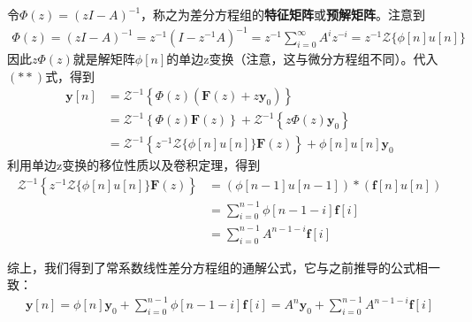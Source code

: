 令$\Phi(z)=(zI - A)^{-1}$，称之为差分方程组的\textbf{特征矩阵}或\textbf{预解矩阵}。注意到\begin{align*}
    \Phi(z)=(zI - A)^{-1} = z^{-1} (I - z^{-1} A)^{-1} = z^{-1} \sum_{i=0}^{\infty}A^i z^{-i} = z^{-1}\mathcal{Z}\{\phi[n]u[n]\}
\end{align*}
因此$z\Phi(z)$就是解矩阵$\phi[n]$的单边z变换（注意，这与微分方程组不同）。代入$(**)$式，得到
\begin{align*}
    \mathbf{y}[n] & = \mathcal{Z}^{-1} \left\{\Phi(z)(\mathbf{F}(z) + z\mathbf{y}_0)\right\}\\
    &= \mathcal{Z}^{-1} \left\{\Phi(z) \mathbf{F}(z)\right\} + \mathcal{Z}^{-1} \left\{z\Phi(z)\mathbf{y}_0\right\}\\
    & = \mathcal{Z}^{-1} \left\{z^{-1}\mathcal{Z}\{\phi[n]u[n]\} \mathbf{F}(z)\right\} +\phi[n]u[n]\mathbf{y}_0
\end{align*}
利用单边z变换的移位性质以及卷积定理，得到\begin{align*}
    \mathcal{Z}^{-1} \left\{z^{-1}\mathcal{Z}\{\phi[n]u[n]\} \mathbf{F}(z)\right\}&=(\phi[n-1]u[n-1]) * (\mathbf{f}[n]u[n])\\
    &=\sum_{i=0}^{n-1} \phi[n-1-i] \mathbf{f}[i]\\
    & = \sum_{i=0}^{n-1} A^{n-1-i} \mathbf{f}[i]
\end{align*}

综上，我们得到了常系数线性差分方程组的通解公式，它与之前推导的公式相一致：
\begin{align*}
    \mathbf{y}[n]= \phi[n]\mathbf{y}_0 + \sum_{i=0}^{n-1} \phi[n-1-i]\mathbf{f}[i]= A^n \mathbf{y}_0 + \sum_{i=0}^{n-1} A^{n-1-i} \mathbf{f}[i]
\end{align*}

